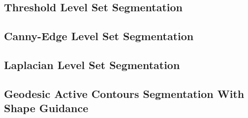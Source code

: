 \ifitkFullVersion

\fi


\subsection{Threshold Level Set Segmentation}
\label{sec:ThresholdSegmentationLevelSetImageFilter}
\ifitkFullVersion

\fi


\subsection{Canny-Edge Level Set Segmentation}
\label{sec:CannySegmentationLevelSetImageFilter}
\ifitkFullVersion

\fi


\subsection{Laplacian Level Set Segmentation}
\label{sec:LaplacianSegmentationLevelSetImageFilter}
\ifitkFullVersion

\fi

\subsection{Geodesic Active Contours Segmentation With Shape Guidance}
\label{sec:GeodesicActiveContourShapePriorLevelSetImageFilter}
\ifitkFullVersion

\fi


